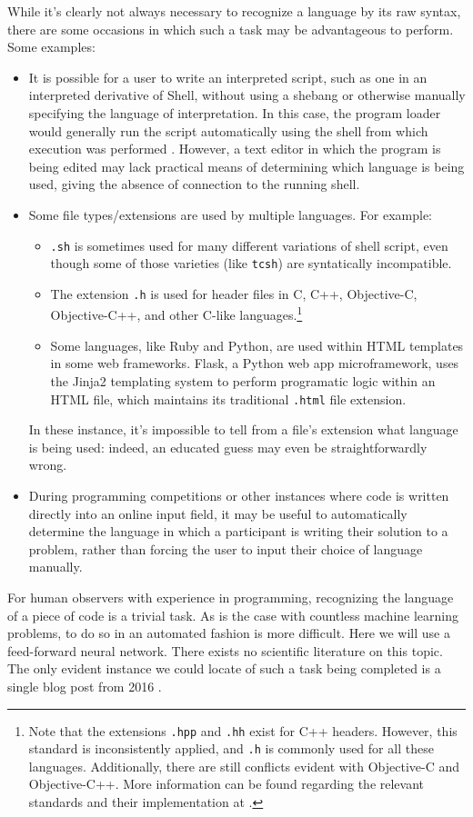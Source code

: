 \documentclass{article}
\begin{document}
While it's clearly not always necessary to recognize a language by its raw syntax, there are some occasions in which such a task may be advantageous to perform. Some examples:
\begin{itemize}
  \item{It is possible for a user to write an interpreted script, such as one in an interpreted derivative of Shell, without using a shebang or otherwise manually specifying the language of interpretation. In this case, the program loader would generally run the script automatically using the shell from which execution was performed \cite{shebang}. However, a text editor in which the program is being edited may lack practical means of determining which language is being used, giving the absence of connection to the running shell.}
  \item{Some file types/extensions are used by multiple languages. For example:
  \begin{itemize}
    \item{\texttt{.sh} is sometimes used for many different variations of shell script, even though some of those varieties (like \texttt{tcsh}) are syntatically incompatible.}
    \item{The extension \texttt{.h} is used for header files in C, C++, Objective-C, Objective-C++, and other C-like languages.\footnote{Note that the extensions \texttt{.hpp} and \texttt{.hh} exist for C++ headers. However, this standard is inconsistently applied, and \texttt{.h} is commonly used for all these languages. Additionally, there are still conflicts evident with Objective-C and Objective-C++. More information can be found regarding the relevant standards and their implementation at \cite{atomh}.}}
    \item{Some languages, like Ruby and Python, are used within HTML templates in some web frameworks. Flask, a Python web app microframework, uses the Jinja2 templating system to perform programatic logic within an HTML file, which maintains its traditional \texttt{.html} file extension.}
  \end{itemize}
  In these instance, it's impossible to tell from a file's extension what language is being used: indeed, an educated guess may even be straightforwardly wrong.}
  \item{During programming competitions or other instances where code is written directly into an online input field, it may be useful to automatically determine the language in which a participant is writing their solution to a problem, rather than forcing the user to input their choice of language manually.}
\end{itemize}
For human observers with experience in programming, recognizing the language of a piece of code is a trivial task. As is the case with countless machine learning problems, to do so in an automated fashion is more difficult. Here we will use a feed-forward neural network. There exists no scientific literature on this topic. The only evident instance we could locate of such a task being completed is a single blog post from 2016 \cite{proglangidmedium}.
\end{document}
